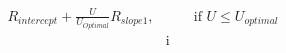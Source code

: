 \documentclass[preview]{standalone}
\begin{document}
\begin{align*}
R_{intercept} +  \frac{U}{U_{Optimal}} R_{slope1}, &\hspace{2em} \text{if }  U \leq U_{optimal}  \\[6pt] & \text{i}
\end{align*}
\end{document}
